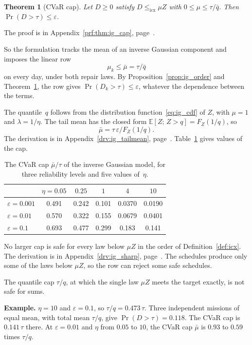 \documentclass[11pt,a4paper]{article}
\theoremstyle{plain}
\newtheorem{theorem}{Theorem}[section]
\theoremstyle{definition}
\theoremstyle{remark}
\begin{document}
\begin{theorem}[CVaR cap]\label{thm:ig_cap}
Let $D \ge 0$ satisfy $D \le_{\mathrm{icx}} \mu Z$ with $0 \le \mu \le \tau/\bar q$.
Then $\Pr(D > \tau) \le \varepsilon$.
\end{theorem}
The proof is in Appendix~\ref{prf:thm:ig_cap}, page~\pageref{prf:thm:ig_cap}.

So the formulation tracks the mean of an inverse Gaussian component and imposes the linear row
\begin{equation}
  \mu_k \le \bar\mu = \tau/\bar q
\end{equation}
on every day, under both repair laws.
By Proposition~\ref{prop:ig_order} and Theorem~\ref{thm:ig_cap}, the row gives $\Pr(D_k > \tau) \le \varepsilon$, whatever the dependence between the terms.

The quantile~$q$ follows from the distribution function~\eqref{eq:ig_cdf} of $Z$, with $\mu = 1$ and $\lambda = 1/\eta$.
The tail mean has the closed form $\mathbb{E}[Z;\, Z > q] = F_Z(1/q)$, so
\begin{equation}
  \bar\mu = \tau\,\varepsilon/F_Z(1/q).
\end{equation}
The derivation is in Appendix~\ref{drv:ig_tailmean}, page~\pageref{drv:ig_tailmean}.
Table~\ref{tab:ig_cap} gives values of the cap.

\begin{table}[htbp]
\centering
\caption{The CVaR cap $\bar\mu/\tau$ of the inverse Gaussian model, for three reliability levels and five values of~$\eta$.}
\label{tab:ig_cap}
\small
\begin{tabular}{@{}lccccc@{}}
\toprule
\rowcolor{headgrey}
 & $\eta = 0.05$ & $0.25$ & $1$ & $4$ & $10$ \\
\midrule
$\varepsilon = 0.001$ & 0.491 & 0.242 & 0.101 & 0.0370 & 0.0190 \\
$\varepsilon = 0.01$ & 0.570 & 0.322 & 0.155 & 0.0679 & 0.0401 \\
$\varepsilon = 0.1$ & 0.693 & 0.477 & 0.299 & 0.183 & 0.141 \\
\bottomrule
\end{tabular}
\end{table}

No larger cap is safe for every law below $\mu Z$ in the order of Definition~\ref{def:icx}.
The derivation is in Appendix~\ref{drv:ig_sharp}, page~\pageref{drv:ig_sharp}.
The schedules produce only some of the laws below $\mu Z$, so the row can reject some safe schedules.

The quantile cap $\tau/q$, at which the single law $\mu Z$ meets the target exactly, is not safe for sums.
\begin{examplebox}
\textbf{Example.} $\eta = 10$ and $\varepsilon = 0.1$, so $\tau/q = 0.473\,\tau$.
Three independent missions of equal mean, with total mean $\tau/q$, give $\Pr(D > \tau) = 0.118$.
The CVaR cap is $0.141\,\tau$ there.
At $\varepsilon = 0.01$ and $\eta$ from $0.05$ to $10$, the CVaR cap $\bar\mu$ is $0.93$ to $0.59$ times $\tau/q$.
\end{examplebox}
\end{document}
